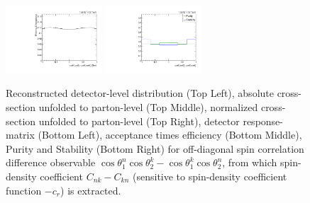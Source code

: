 \begin{figure}[htb]
\begin{center}
 \includegraphics[width=0.32\textwidth]{fig_fullRun2UL/unfolding/combined/TotEff_c_Mnk.pdf}
 \includegraphics[width=0.32\textwidth]{fig_fullRun2UL/unfolding/combined/PurStab_c_Mnk.pdf} \\
\caption{Reconstructed detector-level distribution (Top Left), absolute cross-section unfolded to parton-level (Top Middle), normalized cross-section unfolded to parton-level (Top Right), detector response-matrix (Bottom Left), acceptance times efficiency (Bottom Middle), Purity and Stability (Bottom Right) for off-diagonal spin correlation difference observable $\cos\theta_{1}^{n}\cos\theta_{2}^{k}-\cos\theta_{1}^{k}\cos\theta_{2}^{n}$, from which spin-density coefficient $C_{nk}-C_{kn}$ (sensitive to spin-density coefficient function $-c_r$) is extracted.}
\label{fig:c_Mnk}
\end{center}
\end{figure}
\clearpage
